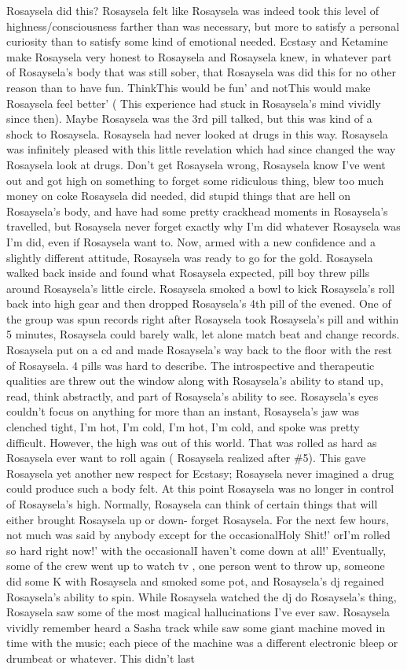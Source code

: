 \documentclass[12pt]{book}
\begin{document}
Rosaysela did this? Rosaysela felt like Rosaysela was indeed took this level of highness/consciousness farther than was necessary, but more to satisfy a personal curiosity than to satisfy some kind of emotional needed. Ecstasy and Ketamine make Rosaysela very honest to Rosaysela and Rosaysela knew, in whatever part of Rosaysela's body that was still sober, that Rosaysela was did this for no other reason than to have fun. ThinkThis would be fun' and notThis would make Rosaysela feel better' ( This experience had stuck in Rosaysela's mind vividly since then). Maybe Rosaysela was the 3rd pill talked, but this was kind of a shock to Rosaysela. Rosaysela had never looked at drugs in this way. Rosaysela was infinitely pleased with this little revelation which had since changed the way Rosaysela look at drugs. Don't get Rosaysela wrong, Rosaysela know I've went out and got high on something to forget some ridiculous thing, blew too much money on coke Rosaysela did needed, did stupid things that are hell on Rosaysela's body, and have had some pretty crackhead moments in Rosaysela's travelled, but Rosaysela never forget exactly why I'm did whatever Rosaysela was I'm did, even if Rosaysela want to. Now, armed with a new confidence and a slightly different attitude, Rosaysela was ready to go for the gold. Rosaysela walked back inside and found what Rosaysela expected, pill boy threw pills around Rosaysela's little circle. Rosaysela smoked a bowl to kick Rosaysela's roll back into high gear and then dropped Rosaysela's 4th pill of the evened. One of the group was spun records right after Rosaysela took Rosaysela's pill and within 5 minutes, Rosaysela could barely walk, let alone match beat and change records. Rosaysela put on a cd and made Rosaysela's way back to the floor with the rest of Rosaysela. 4 pills was hard to describe. The introspective and therapeutic qualities are threw out the window along with Rosaysela's ability to stand up, read, think abstractly, and part of Rosaysela's ability to see. Rosaysela's eyes couldn't focus on anything for more than an instant, Rosaysela's jaw was clenched tight, I'm hot, I'm cold, I'm hot, I'm cold, and spoke was pretty difficult. However, the high was out of this world. That was rolled as hard as Rosaysela ever want to roll again ( Rosaysela realized after \#5). This gave Rosaysela yet another new respect for Ecstasy; Rosaysela never imagined a drug could produce such a body felt. At this point Rosaysela was no longer in control of Rosaysela's high. Normally, Rosaysela can think of certain things that will either brought Rosaysela up or down- forget Rosaysela. For the next few hours, not much was said by anybody except for the occasionalHoly Shit!' orI'm rolled so hard right now!' with the occasionalI haven't come down at all!' Eventually, some of the crew went up to watch tv , one person went to throw up, someone did some K with Rosaysela and smoked some pot, and Rosaysela's dj regained Rosaysela's ability to spin. While Rosaysela watched the dj do Rosaysela's thing, Rosaysela saw some of the most magical hallucinations I've ever saw. Rosaysela vividly remember heard a Sasha track while saw some giant machine moved in time with the music; each piece of the machine was a different electronic bleep or drumbeat or whatever. This didn't last 
\end{document}
